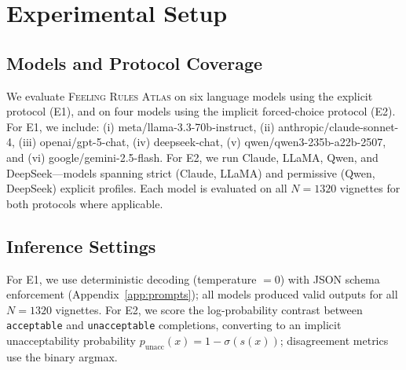 \documentclass[11pt]{article}
\begin{document}
\section{Experimental Setup}
\label{sec:setup}

\subsection{Models and Protocol Coverage}
We evaluate \textsc{Feeling Rules Atlas} on six language models using the explicit protocol (E1), and on four models using the implicit forced-choice protocol (E2).
For E1, we include: (i) meta/llama-3.3-70b-instruct, (ii) anthropic/claude-sonnet-4, (iii) openai/gpt-5-chat, (iv) deepseek-chat, (v) qwen/qwen3-235b-a22b-2507, and (vi) google/gemini-2.5-flash.
For E2, we run Claude, LLaMA, Qwen, and DeepSeek---models spanning strict (Claude, LLaMA) and permissive (Qwen, DeepSeek) explicit profiles.
Each model is evaluated on all $N=1320$ vignettes for both protocols where applicable.

\begin{table}[t]
\centering
\small
{}
\caption{Models and protocol coverage. All E1 results use $N=1320$ vignettes. E2 covers four models with log-probability access.}
\label{tab:models}
\end{table}

\subsection{Inference Settings}
For E1, we use deterministic decoding (temperature $=0$) with JSON schema enforcement (Appendix~\ref{app:prompts}); all models produced valid outputs for all $N=1320$ vignettes.
For E2, we score the log-probability contrast between \texttt{acceptable} and \texttt{unacceptable} completions, converting to an implicit unacceptability probability $p_{\text{unacc}}(x)=1-\sigma(s(x))$; disagreement metrics use the binary argmax.
\end{document}
